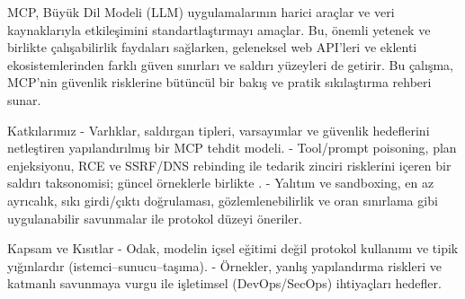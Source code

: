 MCP, Büyük Dil Modeli (LLM) uygulamalarının harici araçlar ve veri kaynaklarıyla etkileşimini standartlaştırmayı amaçlar. Bu, önemli yetenek ve birlikte çalışabilirlik faydaları sağlarken, geleneksel web API’leri ve eklenti ekosistemlerinden farklı güven sınırları ve saldırı yüzeyleri de getirir. Bu çalışma, MCP’nin güvenlik risklerine bütüncül bir bakış ve pratik sıkılaştırma rehberi sunar.

Katkılarımız
- Varlıklar, saldırgan tipleri, varsayımlar ve güvenlik hedeflerini netleştiren yapılandırılmış bir MCP tehdit modeli.
- Tool/prompt poisoning, plan enjeksiyonu, RCE ve SSRF/DNS rebinding ile tedarik zinciri risklerini içeren bir saldırı taksonomisi; güncel örneklerle birlikte \cite{arXiv250323278,arXiv250907595,arXiv250812566,MDPIElectronics3267}.
- Yalıtım ve sandboxing, en az ayrıcalık, sıkı girdi/çıktı doğrulaması, gözlemlenebilirlik ve oran sınırlama gibi uygulanabilir savunmalar ile protokol düzeyi öneriler.

Kapsam ve Kısıtlar
- Odak, modelin içsel eğitimi değil protokol kullanımı ve tipik yığınlardır (istemci–sunucu–taşıma).
- Örnekler, yanlış yapılandırma riskleri ve katmanlı savunmaya vurgu ile işletimsel (DevOps/SecOps) ihtiyaçları hedefler.

